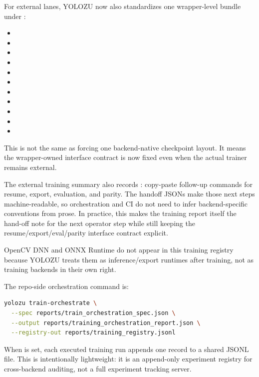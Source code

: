 For external lanes, YOLOZU now also standardizes one wrapper-level bundle under
:
\begin{itemize}
  \item {}
  \item {}
  \item {}
  \item {}
  \item {}
  \item {}
  \item {}
  \item {}
  \item {}
  \item {}
  \item {}
\end{itemize}

This is not the same as forcing one backend-native checkpoint layout. It means
the wrapper-owned interface contract is now fixed even when the actual trainer
remains external.

The external training summary also records : copy-paste
follow-up commands for resume, export, evaluation, and parity. The handoff JSONs make
those next steps machine-readable, so orchestration and CI do not need to infer
backend-specific conventions from prose. In practice, this makes the training
report itself the hand-off note for the next operator step while still keeping
the resume/export/eval/parity interface contract explicit.

OpenCV DNN and ONNX Runtime do not appear in this training registry because
YOLOZU treats them as inference/export runtimes after training, not as
training backends in their own right.

The repo-side orchestration command is:
\begin{lstlisting}[language=bash]
yolozu train-orchestrate \
  --spec reports/train_orchestration_spec.json \
  --output reports/training_orchestration_report.json \
  --registry-out reports/training_registry.jsonl
\end{lstlisting}

When \cmd{--registry-out} is set, each executed training run appends one
 record to a shared JSONL file.
This is intentionally lightweight: it is an append-only experiment registry for
cross-backend auditing, not a full experiment tracking server.

